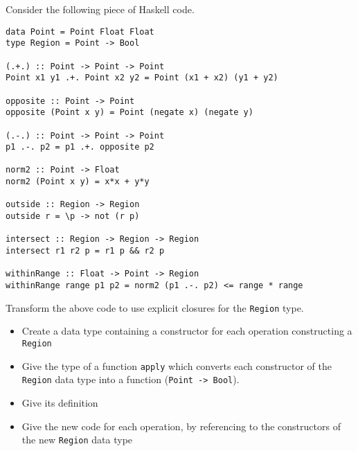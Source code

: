 \documentclass{article}
\newcommand{\answer}[1]{}
\begin{document}
Consider the following piece of Haskell code.
\begin{verbatim}
data Point = Point Float Float
type Region = Point -> Bool

(.+.) :: Point -> Point -> Point
Point x1 y1 .+. Point x2 y2 = Point (x1 + x2) (y1 + y2)

opposite :: Point -> Point
opposite (Point x y) = Point (negate x) (negate y)

(.-.) :: Point -> Point -> Point
p1 .-. p2 = p1 .+. opposite p2

norm2 :: Point -> Float
norm2 (Point x y) = x*x + y*y

outside :: Region -> Region
outside r = \p -> not (r p)

intersect :: Region -> Region -> Region
intersect r1 r2 p = r1 p && r2 p

withinRange :: Float -> Point -> Region
withinRange range p1 p2 = norm2 (p1 .-. p2) <= range * range
\end{verbatim}

Transform the above code to use explicit closures for the
\texttt{Region} type.

\begin{itemize}
\item Create a data type containing a constructor for each operation constructing a \texttt{Region} 
\item Give the type of a function \texttt{apply} which converts each constructor of the \texttt{Region} data type into a function (\texttt{Point -> Bool}). 
\item Give its definition 
\item Give the new code for each operation, by referencing to the constructors of the new \texttt{Region} data type 
\end{itemize}

\answer{
  \begin{verbatim}
data Region = Outside Region
            | Intersect Region Region
            | Within Float Point

apply :: Region -> Point -> Bool
apply (Outside r) p       = not (apply r p)
apply (Intersect r1 r2) p = apply r1 p && apply r2 p
apply (Within range p1) p2 = norm2 (p1 .-. p2) <= range * range

outside :: Region -> Region
outside r = Outside r

intersect :: Region -> Region -> Region
intersect r1 r2 = Intersect r1 r2

withinRange :: Float -> Point -> Region
withinRange range p1 p2 = Within range p1 p2
  \end{verbatim}
}
\newpage
\end{document}

